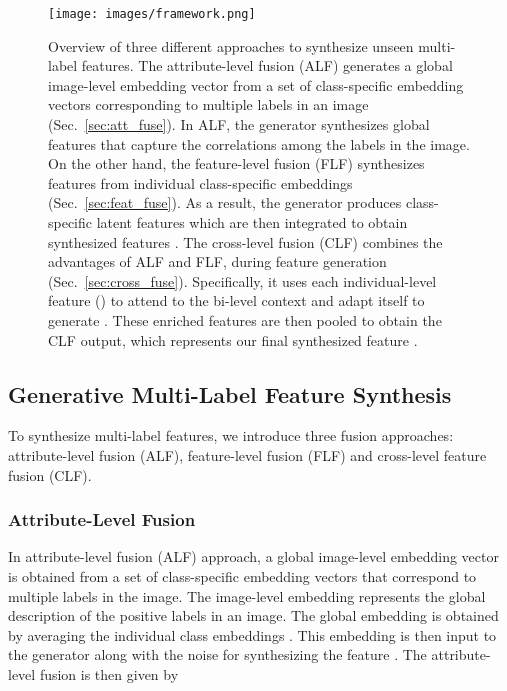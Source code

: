 \documentclass[final]{cvpr}
\begin{document}
\begin{figure*}[t]
    \centering
    \texttt{[image: images/framework.png]}
    \caption{Overview of three different approaches to synthesize unseen multi-label features. The attribute-level fusion (ALF) generates a global image-level embedding vector from a set of class-specific embedding vectors corresponding to multiple labels in an image (Sec.~\ref{sec:att_fuse}). In ALF, the generator synthesizes global features  that capture the correlations among the labels in the image. On the other hand, the feature-level fusion (FLF) synthesizes features from individual class-specific embeddings (Sec.~\ref{sec:feat_fuse}). As a result, the generator produces class-specific latent features which are then integrated to obtain synthesized features . The cross-level fusion (CLF) combines the advantages of ALF and FLF, during feature generation (Sec.~\ref{sec:cross_fuse}). Specifically, it uses each individual-level feature () to attend to the bi-level context and adapt itself to generate . These enriched features are then pooled to obtain the CLF output, which represents our final synthesized feature .\vspace{-0.2cm} }
    \label{fig:caf_fuse}
\end{figure*}







\subsection{Generative Multi-Label Feature Synthesis}

To synthesize multi-label features, we introduce three fusion approaches: attribute-level fusion (ALF), feature-level fusion (FLF) and cross-level feature fusion (CLF). 

\subsubsection{Attribute-Level Fusion\label{sec:att_fuse}}

In attribute-level fusion (ALF) approach, a global image-level embedding vector is obtained from a set of class-specific embedding vectors that correspond to multiple labels in the image. The image-level embedding represents the global description of the positive labels in an image.  The global embedding 
 is obtained by averaging the individual class embeddings . This embedding  is then input to the generator  along with the noise  for synthesizing the feature . The attribute-level fusion is then given by
\end{document}
